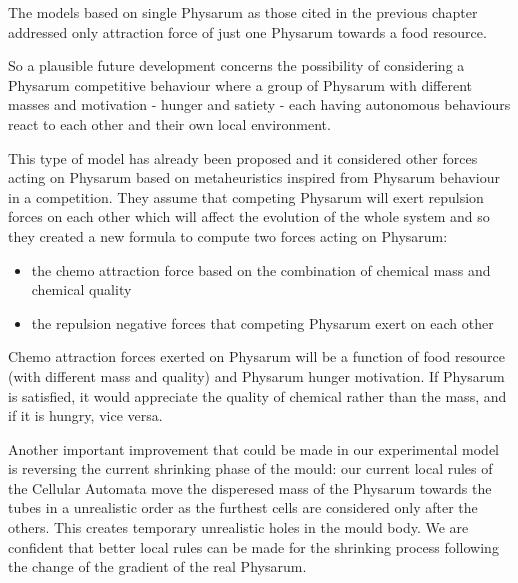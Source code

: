 \par
The models based on single Physarum as those cited in the previous chapter addressed only attraction force of just one Physarum towards a food resource.

\par
So a plausible future development concerns the possibility of considering a Physarum competitive behaviour where a group of Physarum with different masses and motivation - hunger and satiety - each having autonomous behaviours react to each other and their own local environment. 

\par
This type of model has already been proposed \cite{hex_phy} and it considered other forces acting on Physarum based on metaheuristics inspired from Physarum behaviour in a competition. They assume that competing Physarum will exert repulsion forces on each other which will affect the evolution of the whole system and so they created a new formula to compute two forces acting on Physarum: 

\begin{itemize}
	\item the chemo attraction force based on the combination of chemical mass and chemical quality
	\item the repulsion negative forces that competing Physarum exert on each other
\end{itemize}

Chemo attraction forces exerted on Physarum will be a function of food resource (with different mass and quality) and Physarum hunger motivation. If Physarum is satisfied, it would appreciate the quality of chemical rather than the mass, and if it is hungry, vice versa.

\par
Another important improvement that could be made in our experimental model is reversing the current shrinking phase of the mould: our current local rules of the Cellular Automata move the disperesed mass of the Physarum towards the tubes in a unrealistic order as the furthest cells are considered only after the others. This creates temporary unrealistic holes in the mould body. We are confident that better local rules can be made for the shrinking process following the change of the gradient of the real Physarum.


